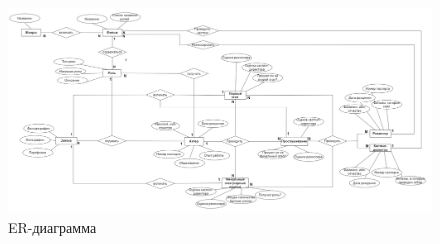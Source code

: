 \documentclass[a3paper]{article}
\begin{document}
	\begin{landscape}
	\begin{figure}[h]
		\centering
		\includegraphics[width=1.0\linewidth]{ER.png}
		\caption{ER-диаграмма}
		\label{fig:ER}
	\end{figure}
		
	\end{landscape}    
\end{document}
